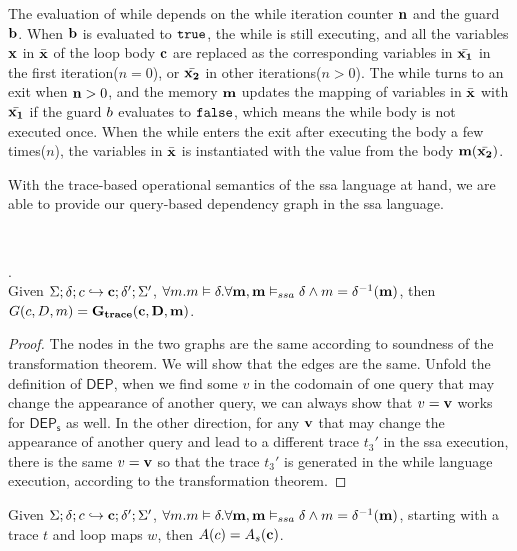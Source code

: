 \documentclass[a4paper,11pt]{article}
\begin{document}
{
	The evaluation of while depends on the while iteration counter $\mathbf{{n}}$ and the guard $\mathbf{{b}}$. 
	When $\mathbf{{b}}$ is evaluated to $\mathtt{true}$, the while is still executing, and all the variables $\mathbf{{x}}$ in $\bar{\mathbf{{x}}}$ of the loop body $\mathbf{{c}}$ are replaced as the corresponding variables in $\bar{\mathbf{{x_1}}}$ in the first iteration($n=0$), or $\bar{\mathbf{{x_2}}}$ in other iterations($n > 0$). 
	The while turns to an exit when $\mathbf{{n}} > 0$, 
	and the memory $\mathbf{{m}}$ updates the mapping of variables in $\bar{\mathbf{{x}}}$ with $\bar{\mathbf{{x_1}}}$ if the guard $b$ evaluates to $\mathtt{false}$, 
	which means the while body is not executed once. 
	When the while enters the exit after executing the body a few times($n$), the variables in $\bar{\mathbf{{x}}}$ is instantiated with the value from the body $\mathbf{{m}}(\bar{\mathbf{{x_2}}})$. 
}

{
	With the trace-based operational semantics of the ssa language at hand, we are able to provide our query-based dependency graph in the ssa language.
}
%
\begin{defn}
\\
\end{defn}
%
%
\begin{thm}.
\\
{
Given $\Sigma; \delta ; c \hookrightarrow \mathbf{{c}} ; \delta';\Sigma' $,
$\forall m. m \vDash \delta. \forall \mathbf{{m}}, \mathbf{{m}} \vDash_{ssa} \delta \land m = \delta^{-1}(\mathbf{{m}})$, 
then $G(c,D,m) = \bf{G_{trace}}(\mathbf{{c}}, D,\mathbf{{m}}) $.
}
\end{thm}
%
\begin{proof}
 The nodes in the two graphs are the same according to soundness of the transformation theorem. We will show that the edges are the same. Unfold the definition of $\mathsf{DEP}$, when we find some $v$ in the codomain of one query that may change the appearance of another query,  we can always show that $v = \mathbf{{v}}$ works for $\mathsf{DEP_s}$ as well. In the other direction, for any $\mathbf{{v}}$ that may change the appearance of another query and lead to a different trace $t_3'$ in the ssa execution, there is the same $v = \mathbf{{v}}$ so that the trace $t_3'$ is generated in the while language execution, according to the transformation theorem.  
\end{proof}
%
\begin{coro}
{Given $\Sigma; \delta ; c \hookrightarrow \mathbf{{c}} ; \delta';\Sigma' $, 
$\forall m. m \vDash \delta. \forall \mathbf{{m}}, \mathbf{{m}} \vDash_{ssa} \delta \land m = \delta^{-1}(\mathbf{{m}})$, starting with a trace $t$ and loop maps $w$, then 
$A(c) = A_s(\mathbf{{c}}) $.
}
\end{coro}
%
\end{document}
